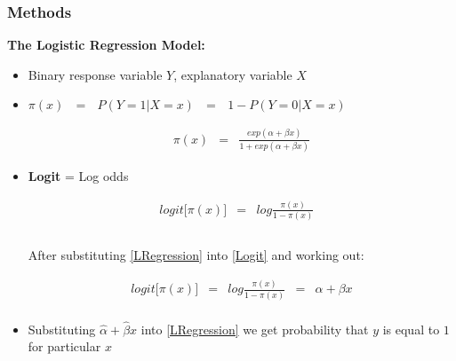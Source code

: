 \documentclass{beamer}              %
\begin{document}
\begin{frame}

\frametitle{Methods}\label{MethodsLogit} 
\textbf{The Logistic Regression Model:}
\begin{itemize}
\item Binary response variable $Y$, explanatory variable $X$
\item $\pi(x)~~~ =~~~ P(Y=1|X=x) ~~~=~~~ 1-P(Y=0|X=x)$


\begin{equation}\label{LRegression}
\begin{array}{lcl}

\pi(x) &=& \frac{exp(\alpha+ \beta x)}{1+exp(\alpha+ \beta x)}
\end{array}
\end{equation}

\item \textbf{Logit} = Log odds

\begin{equation}\label{Logit}
\begin{array}{lclcl}

logit \big[ \pi(x) \big] &=& log \frac{ \pi(x)}{1- \pi(x)} & \\
\\
\end{array}
\end{equation}


After substituting \eqref{LRegression} into \eqref{Logit} and working out:

\begin{equation}\label{Logit2}
\begin{array}{lclcl}


logit \big[ \pi(x) \big] &=& log \frac{ \pi(x)}{1- \pi(x)}  &=& \alpha + \beta x \\
\end{array}
\end{equation}

\item Substituting $\hat{\alpha} + \hat{\beta} x$ into \eqref{LRegression} we get probability that $y$ is equal to $1$ for particular $x$

\end{itemize}

\end{frame}



\end{document}
